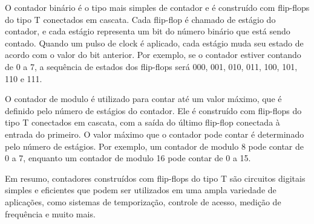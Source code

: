 O contador binário é o tipo mais simples de contador e é construído com flip-flops do tipo T conectados em cascata. Cada flip-flop é chamado de estágio do contador, e cada estágio representa um bit do número binário que está sendo contado. Quando um pulso de clock é aplicado, cada estágio muda seu estado de acordo com o valor do bit anterior. Por exemplo, se o contador estiver contando de 0 a 7, a sequência de estados dos flip-flops será 000, 001, 010, 011, 100, 101, 110 e 111.

O contador de modulo é utilizado para contar até um valor máximo, que é definido pelo número de estágios do contador. Ele é construído com flip-flops do tipo T conectados em cascata, com a saída do último flip-flop conectada à entrada do primeiro. O valor máximo que o contador pode contar é determinado pelo número de estágios. Por exemplo, um contador de modulo 8 pode contar de 0 a 7, enquanto um contador de modulo 16 pode contar de 0 a 15.

Em resumo, contadores construídos com flip-flops do tipo T são circuitos digitais simples e eficientes que podem ser utilizados em uma ampla variedade de aplicações, como sistemas de temporização, controle de acesso, medição de frequência e muito mais.